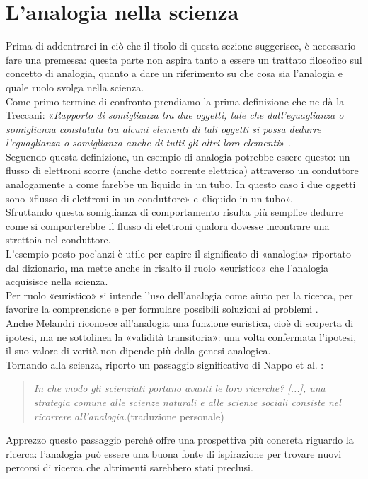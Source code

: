 \section{L'analogia nella scienza}

Prima di addentrarci in ciò che il titolo di questa sezione suggerisce, è necessario fare una premessa: questa parte non aspira tanto a essere
un trattato filosofico sul concetto di analogia, quanto a dare un
riferimento su che cosa sia l'analogia e quale ruolo svolga nella scienza.\\
Come primo termine di confronto prendiamo la prima definizione che ne dà la Treccani:
«\textit{Rapporto di somiglianza tra due oggetti, tale che dall’eguaglianza o somiglianza constatata
tra alcuni elementi di tali oggetti si possa dedurre l’eguaglianza o somiglianza anche di
tutti gli altri loro elementi}» \cite{analogia_treccani}.\\
Seguendo questa definizione, un esempio di analogia potrebbe essere questo: un flusso di elettroni scorre (anche detto corrente elettrica)
attraverso un conduttore analogamente a come farebbe un liquido in un tubo. In questo caso i due oggetti sono «flusso di elettroni in un conduttore» e
«liquido in un tubo».\\ 
Sfruttando questa somiglianza di comportamento risulta più semplice dedurre come si comporterebbe il flusso di elettroni
qualora dovesse incontrare una strettoia nel conduttore.\\
L'esempio posto poc'anzi è utile per capire il significato di «analogia» riportato dal dizionario, ma mette anche in risalto il ruolo «euristico» \cite{Shelley2019} che
l'analogia acquisisce nella scienza.\\
Per ruolo «euristico» si intende l'uso dell'analogia come aiuto per la ricerca, per favorire la comprensione e per formulare possibili soluzioni
ai problemi \cite{Shelley2019}.\\
Anche Melandri \cite[pp.~22--23]{melandri2023analogia} riconosce all'analogia una funzione euristica, cioè di scoperta di ipotesi, 
ma ne sottolinea la «validità transitoria»: una volta confermata l'ipotesi, il suo valore di verità non dipende più dalla genesi analogica.\\
Tornando alla scienza, riporto un passaggio significativo di Nappo et al. \cite{nappo2026analogical}:

\begin{quote}
    \textit{In che modo gli scienziati portano avanti le loro ricerche? [...], una strategia comune alle
    scienze naturali e alle scienze sociali consiste nel ricorrere all’analogia.}(traduzione personale)
\end{quote}
Apprezzo questo passaggio perché offre una prospettiva più concreta riguardo la ricerca: l'analogia può essere una buona fonte di ispirazione
per trovare nuovi percorsi di ricerca che altrimenti sarebbero stati preclusi.\\

